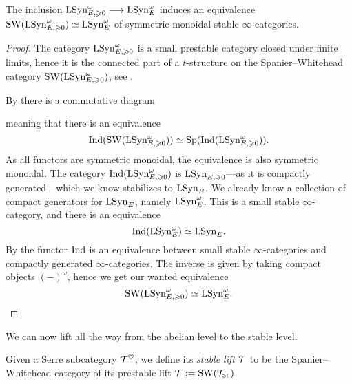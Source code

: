 \begin{theorem}
    \label{ch3:add:thm:prestable-freyd-stabilizes-to-stable-Freyd}
    The inclusion $\mathrm{LSyn}_{E, \geqslant 0}^\omega \longrightarrow \mathrm{LSyn}_{E}^\omega$ induces an equivalence $\operatorname{SW}(\mathrm{LSyn}_{E, \geqslant 0}^\omega)\simeq \mathrm{LSyn}_{E}^\omega$ of symmetric monoidal stable $\infty$-categories. 
\end{theorem}
\begin{proof}
    The category $\mathrm{LSyn}_{E, \geqslant 0}^\omega$ is a small prestable category closed under finite limits, hence it is the connected part of a $t$-structure on the Spanier--Whitehead category $\operatorname{SW}(\mathrm{LSyn}_{E, \geqslant 0}^\omega)$, see \cite[C.1.1, C.1.2]{lurie_SAG}. 

    By \cite[C.1.1.6]{lurie_SAG} there is a commutative diagram
    \begin{center}
    \end{center}
    meaning that there is an equivalence
    \[\operatorname{Ind}(\operatorname{SW}(\mathrm{LSyn}_{E, \geqslant 0}^\omega))\simeq \mathrm{Sp}(\operatorname{Ind}(\mathrm{LSyn}_{E, \geqslant 0}^\omega)).\]
    As all functors are symmetric monoidal, the equivalence is also symmetric monoidal. The category $\operatorname{Ind}(\mathrm{LSyn}_{E, \geqslant 0}^\omega)$ is $\mathrm{LSyn}_{E, \geqslant 0}$---as it is compactly generated---which we know stabilizes to $\mathrm{LSyn}_{E}$. We already know a collection of compact generators for $\mathrm{LSyn}_{E}$, namely $\mathrm{LSyn}_{E}^\omega$. This is a small stable $\infty$-category, and there is an equivalence 
    \[\operatorname{Ind}(\mathrm{LSyn}_{E}^\omega)\simeq \mathrm{LSyn}_{E}.\] 
    By \cite[5.3.2.11(3)]{Lurie_HA} the functor $\operatorname{Ind}$ is an equivalence between small stable $\infty$-categories and compactly generated $\infty$-categories. The inverse is given by taking compact objects $(-)^\omega$, hence we get our wanted equivalence 
    \[\operatorname{SW}(\mathrm{LSyn}_{E, \geqslant 0}^\omega)\simeq \mathrm{LSyn}_{E}^\omega.\]
\end{proof}

We can now lift all the way from the abelian level to the stable level. 

\begin{definition}
    Given a Serre subcategory $\mathcal{T}^\heartsuit$, we define its \emph{stable lift} $\mathcal{T}$ to be the Spanier--Whitehead category of its prestable lift $\mathcal{T}:= \operatorname{SW}(\mathcal{T}_{\hspace{-1pt}\scriptscriptstyle\geqslant 0})$. 
\end{definition}

